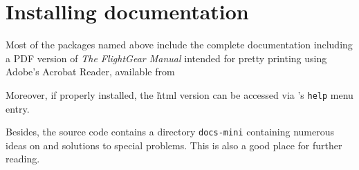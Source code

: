 \section{Installing documentation}

Most of the packages named above include the complete \FlightGear{}
documentation including a PDF version of \textit{The FlightGear
Manual} intended for pretty printing using Adobe's Acrobat Reader,
available from
\medskip

 \medskip

 \noindent
 Moreover, if properly installed, the \.html version can be accessed via
\FlightGear{}'s \texttt{help} menu entry.

Besides, the source code contains a directory \texttt{docs-mini} containing numerous
ideas on and solutions to special problems. This is also a good place for further
reading.


